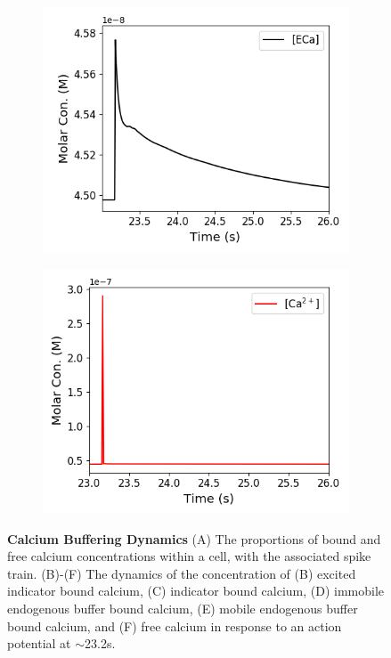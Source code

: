\begin{figure}[p]
\begin{subfigure}{0.5\textwidth}
    \includegraphics[width=\textwidth]{figures/calcium_chapter/concentration_dynamics_18_zoomed_ECa.png}
    \caption{}
  \end{subfigure}
  \begin{subfigure}{0.5\textwidth}
    \includegraphics[width=\textwidth]{figures/calcium_chapter/concentration_dynamics_18_zoomed_Ca.png}
    \caption{}
  \end{subfigure}
  \caption{\textbf{Calcium Buffering Dynamics } (A) The proportions of bound and free calcium concentrations within a cell, with the associated spike train. (B)-(F) The dynamics of the concentration of (B) excited indicator bound calcium, (C) indicator bound calcium, (D) immobile endogenous buffer bound calcium, (E) mobile endogenous buffer bound calcium, and (F) free calcium in response to an action potential at $\sim$23.2s.}
  \label{fig:concentrations}
\end{figure}

